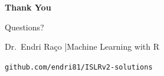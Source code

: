 \documentclass[aspectratio=169, 11pt]{beamer}
\begin{document}
\begin{frame}{}
\centering
\vspace{2cm}
{\Huge\textbf{Thank You}}

\vspace{1em}
{\Large Questions?}

\vspace{1.5em}
{\large Dr.\ Endri Ra\c{c}o \quad|\quad Machine Learning with R}

\vspace{0.5em}
{\normalsize \texttt{github.com/endri81/ISLRv2-solutions}}
\end{frame}
\end{document}
